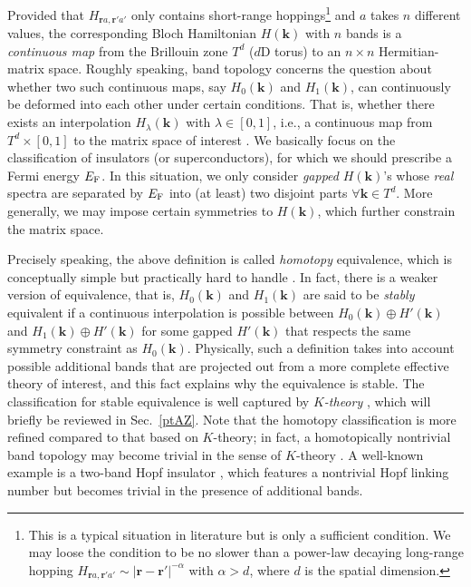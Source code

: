 \documentclass{tADP2e}
\theoremstyle{plain}
\theoremstyle{plain}
\theoremstyle{definition}
\begin{document}
Provided that $H_{\boldsymbol{r}a,\boldsymbol{r}'a'}$ only contains short-range hoppings\footnote{This is a typical situation in literature but is only a sufficient condition. We may loose the condition to be no slower than a power-law decaying long-range hopping $H_{\boldsymbol{r}a,\boldsymbol{r}'a'}\sim |\boldsymbol{r}-\boldsymbol{r}'|^{-\alpha}$ with $\alpha>d$, where $d$ is the spatial dimension.} and $a$ takes $n$ different values, the corresponding Bloch Hamiltonian $H(\boldsymbol{k})$ with $n$ bands is a \emph{continuous map} from the %
Brillouin zone $T^d$ ($d$D torus) to an $n\times n$ Hermitian-matrix space. %
Roughly speaking, band topology concerns the question about whether two such continuous maps, say $H_0(\boldsymbol{k})$ and $H_1(\boldsymbol{k})$, can continuously be deformed into each other under certain conditions. That is, whether there exists an %
interpolation $H_\lambda(\boldsymbol{k})$ with $\lambda\in[0,1]$, i.e., a continuous map from $T^d\times[0,1]$ to the matrix space of interest \cite{AK09}. We basically focus on the classification of insulators (or superconductors), for which we should prescribe a Fermi energy $E_{\rm F}$. In this situation, we only consider \emph{gapped} %
$H(\boldsymbol{k})$'s whose \emph{real} spectra are separated by $E_{\rm F}$ into (at least) two disjoint parts $\forall\boldsymbol{k}\in T^d$. More generally, we may impose certain symmetries to $H(\boldsymbol{k})$, which further constrain the matrix space. 


Precisely speaking,  the above definition is called \emph{homotopy} equivalence, which is conceptually simple but practically hard to handle \cite{KR15}. In fact, there is a weaker version of equivalence, that is, %
$H_0(\boldsymbol{k})$ and $H_1(\boldsymbol{k})$ are said to be \emph{stably} equivalent if a continuous interpolation is possible between $H_0(\boldsymbol{k})\oplus H'(\boldsymbol{k})$ and $H_1(\boldsymbol{k})\oplus H'(\boldsymbol{k})$ for some gapped $H'(\boldsymbol{k})$ that respects the same symmetry constraint as $H_0(\boldsymbol{k})$. Physically, such a definition takes into account possible additional bands that are projected out from a more complete effective theory of interest, and this fact explains why the equivalence is stable. The classification for stable equivalence is well captured by \emph{$K$-theory} \cite{MK08}, which will briefly be reviewed in Sec.~\ref{ptAZ}. Note that the homotopy classification is more refined compared to that based on $K$-theory; in fact,  a homotopically nontrivial band topology may become trivial in the sense of $K$-theory \cite{KR15}. A well-known example is a two-band Hopf insulator \cite{MJE08}, which features 
a nontrivial Hopf linking number but becomes trivial in the presence of additional bands.
\end{document}
